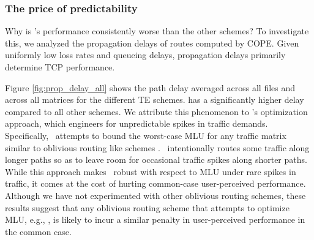   
 
%
%


\subsubsection{The price of predictability}
Why is \cope's performance consistently worse than the other schemes? To investigate this, we analyzed the propagation delays of routes computed by COPE. Given uniformly low loss rates and queueing delays, propagation delays primarily determine TCP performance.

Figure \ref{fig:prop_delay_all} shows the path delay averaged across all files and across all matrices for the different TE schemes. \cope{} has a significantly higher delay compared to all other schemes. We attribute this phenomenon to \cope{}'s optimization approach, which engineers for unpredictable spikes in traffic demands. Specifically, \cope\ attempts to bound the worst-case MLU for any traffic matrix similar to oblivious routing like schemes \cite{Cohen}. \cope\ intentionally routes some traffic along longer paths so as to leave room for occasional traffic spikes along shorter paths. While this approach makes \cope\ robust with respect to MLU under rare spikes in traffic, it comes at the cost of hurting common-case user-perceived performance.  Although we have not experimented with other oblivious routing schemes, these results suggest that any oblivious routing scheme that attempts to optimize MLU, e.g., \cite{Cohen}, is likely to incur a similar penalty in  user-perceived performance in the common case. 




